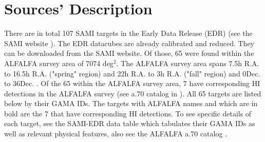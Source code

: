 \documentclass[10pt,letterpaper]{article}
\begin{document}
\section{Sources' Description}
\label{sec:sources}
There are in total 107 SAMI targets in the Early Data Release (EDR) (see the SAMI website \cite{SAMI instrument front-page}). The EDR datacubes are already calibrated and reduced. They can be downloaded from the SAMI website. Of those, 65 were found within the ALFALFA survey area of 7074 deg$^2$. The ALFALFA survey area spans 7.5h R.A. to 16.5h R.A. ("spring" region) and 22h R.A. to 3h R.A. ("fall" region) and 0\degree Dec. to 36\degree Dec. \cite{mass function}. Of the 65 within the ALFALFA survey area, 7 have corresponding HI detections in the ALFALFA survey (see a.70 catalog in \cite{alfalfa data}). All 65 targets are listed below by their GAMA IDs. The targets with ALFALFA names and which are in bold are the 7 that have corresponding HI detections. To see specific details of each target, see the SAMI-EDR data table \cite{SAMI Early Data Release} which tabulates their GAMA IDs as well as relevant physical features, also see the ALFALFA a.70 catalog \cite{alfalfa data}. \\
\end{document}
